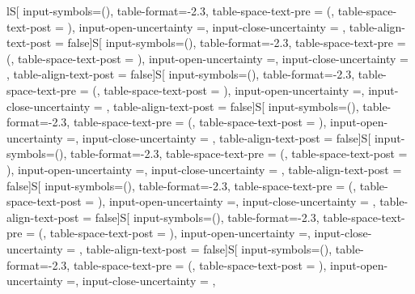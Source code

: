 \begin{table}

\caption{\label{tab:norway_national} \textbf{Probabilities of Winning Re-Election in Norway's National Elections (Difference-in-Differences).} }
\centering
\fontsize{9}{11}\selectfont
\begin{threeparttable}
\begin{tabular}[t]{lS[
              input-symbols=(),
              table-format=-2.3,
              table-space-text-pre    = (,
              table-space-text-post   = ),
              input-open-uncertainty  =,
              input-close-uncertainty = ,
              table-align-text-post = false]S[
              input-symbols=(),
              table-format=-2.3,
              table-space-text-pre    = (,
              table-space-text-post   = ),
              input-open-uncertainty  =,
              input-close-uncertainty = ,
              table-align-text-post = false]S[
              input-symbols=(),
              table-format=-2.3,
              table-space-text-pre    = (,
              table-space-text-post   = ),
              input-open-uncertainty  =,
              input-close-uncertainty = ,
              table-align-text-post = false]S[
              input-symbols=(),
              table-format=-2.3,
              table-space-text-pre    = (,
              table-space-text-post   = ),
              input-open-uncertainty  =,
              input-close-uncertainty = ,
              table-align-text-post = false]S[
              input-symbols=(),
              table-format=-2.3,
              table-space-text-pre    = (,
              table-space-text-post   = ),
              input-open-uncertainty  =,
              input-close-uncertainty = ,
              table-align-text-post = false]S[
              input-symbols=(),
              table-format=-2.3,
              table-space-text-pre    = (,
              table-space-text-post   = ),
              input-open-uncertainty  =,
              input-close-uncertainty = ,
              table-align-text-post = false]S[
              input-symbols=(),
              table-format=-2.3,
              table-space-text-pre    = (,
              table-space-text-post   = ),
              input-open-uncertainty  =,
              input-close-uncertainty = ,
              table-align-text-post = false]S[
              input-symbols=(),
              table-format=-2.3,
              table-space-text-pre    = (,
              table-space-text-post   = ),
              input-open-uncertainty  =,
              input-close-uncertainty = ,
}
\end{tabular}
\end{threeparttable}
\end{table}
